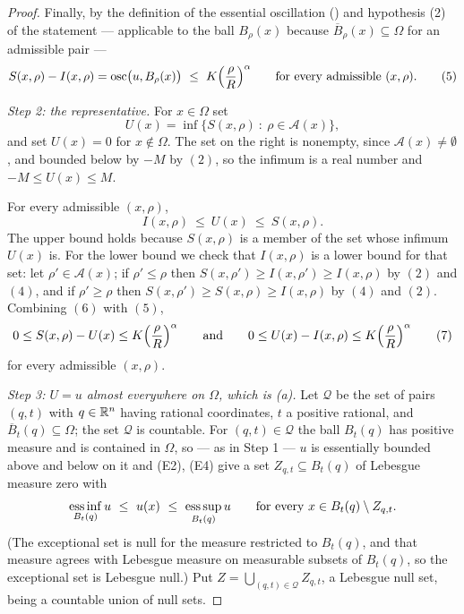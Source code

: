 \begin{proof}
Finally, by the definition of the essential oscillation () and
hypothesis (2) of the statement --- applicable to the ball $B_\rho(x)$ because
$\overline B_\rho(x)\subseteq\Omega$ for an admissible pair ---
\[
S(x,\rho)-I(x,\rho)=\operatorname*{osc}\bigl(u,B_\rho(x)\bigr)
\ \le\ K\Bigl(\frac\rho R\Bigr)^{\alpha}
\qquad\text{for every admissible }(x,\rho).
\tag{5}
\]

\emph{Step 2: the representative.}  For $x\in\Omega$ set
\[
U(x)=\inf\bigl\{S(x,\rho)\ :\ \rho\in\mathcal A(x)\bigr\},
\]
and set $U(x)=0$ for $x\notin\Omega$.  The set on the right is nonempty, since
$\mathcal A(x)\ne\emptyset$, and bounded below by $-M$ by $(2)$, so the infimum
is a real number and $-M\le U(x)\le M$.

For every admissible $(x,\rho)$,
\[
I(x,\rho)\ \le\ U(x)\ \le\ S(x,\rho).
\tag{6}
\]
The upper bound holds because $S(x,\rho)$ is a member of the set whose infimum
$U(x)$ is.  For the lower bound we check that $I(x,\rho)$ is a lower bound for
that set: let $\rho'\in\mathcal A(x)$; if $\rho'\le\rho$ then
$S(x,\rho')\ge I(x,\rho')\ge I(x,\rho)$ by $(2)$ and $(4)$, and if
$\rho'\ge\rho$ then $S(x,\rho')\ge S(x,\rho)\ge I(x,\rho)$ by $(4)$ and $(2)$.
Combining $(6)$ with $(5)$,
\[
0\le S(x,\rho)-U(x)\le K\Bigl(\frac\rho R\Bigr)^{\alpha}
\qquad\text{and}\qquad
0\le U(x)-I(x,\rho)\le K\Bigl(\frac\rho R\Bigr)^{\alpha}
\tag{7}
\]
for every admissible $(x,\rho)$.

\emph{Step 3: $U=u$ almost everywhere on $\Omega$, which is (a).}  Let
$\mathcal Q$ be the set of pairs $(q,t)$ with $q\in\mathbb{R}^n$ having rational
coordinates, $t$ a positive rational, and $\overline B_t(q)\subseteq\Omega$; the
set $\mathcal Q$ is countable.  For $(q,t)\in\mathcal Q$ the ball $B_t(q)$ has
positive measure and is contained in $\Omega$, so --- as in Step 1 --- $u$ is
essentially bounded above and below on it and (E2), (E4) give a set
$Z_{q,t}\subseteq B_t(q)$ of Lebesgue measure zero with
\[
\operatorname*{ess\,inf}_{B_t(q)}u\ \le\ u(x)\ \le\
\operatorname*{ess\,sup}_{B_t(q)}u
\qquad\text{for every }x\in B_t(q)\setminus Z_{q,t} .
\]
(The exceptional set is null for the measure restricted to $B_t(q)$, and that
measure agrees with Lebesgue measure on measurable subsets of $B_t(q)$, so the
exceptional set is Lebesgue null.)  Put $Z=\bigcup_{(q,t)\in\mathcal Q}Z_{q,t}$,
a Lebesgue null set, being a countable union of null sets.


\end{proof}
